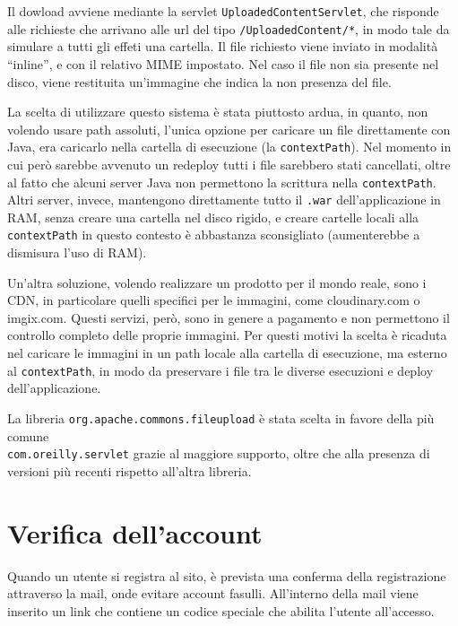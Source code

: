Il dowload avviene mediante la servlet \texttt{UploadedContentServlet}, che risponde alle richieste che arrivano alle url del tipo \texttt{/UploadedContent/*}, in modo tale da simulare a tutti gli effeti una cartella. Il file richiesto viene inviato in modalità ``inline'', e con il relativo MIME impostato. Nel caso il file non sia presente nel disco, viene restituita un'immagine che indica la non presenza del file.

La scelta di utilizzare questo sistema è stata piuttosto ardua, in quanto, non volendo usare path assoluti, l'unica opzione per caricare un file direttamente con Java, era caricarlo nella cartella di esecuzione (la \texttt{contextPath}). Nel momento in cui però sarebbe avvenuto un redeploy tutti i file sarebbero stati cancellati, oltre al fatto che alcuni server Java non permettono la scrittura nella \texttt{contextPath}. Altri server, invece, mantengono direttamente tutto il \texttt{.war} dell'applicazione in RAM, senza creare una cartella nel disco rigido, e creare cartelle locali alla \texttt{contextPath} in questo contesto è abbastanza sconsigliato (aumenterebbe a dismisura l'uso di RAM).

Un'altra soluzione, volendo realizzare un prodotto per il mondo reale, sono i CDN, in particolare quelli specifici per le immagini, come cloudinary.com o imgix.com. Questi servizi, però, sono in genere a pagamento e non permettono il controllo completo delle proprie immagini. Per questi motivi la scelta è ricaduta nel caricare le immagini in un path locale alla cartella di esecuzione, ma esterno al \texttt{contextPath}, in modo da preservare i file tra le diverse esecuzioni e deploy dell'applicazione.

La libreria \texttt{org.apache.commons.fileupload} è stata scelta in favore della più comune \\\texttt{com.oreilly.servlet} grazie al maggiore supporto, oltre che alla presenza di versioni più recenti rispetto all'altra libreria.



\chapter{Verifica dell'account}

Quando un utente si registra al sito, è prevista una conferma della registrazione attraverso la mail, onde evitare account fasulli. All'interno della mail viene inserito un link che contiene un codice speciale che abilita l'utente all'accesso.

